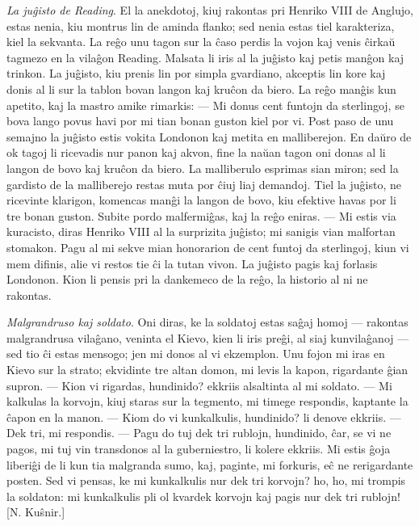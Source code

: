 \emph{La ju\^gisto de Reading}. El la anekdotoj, kiuj rakontas pri
Henriko VIII de Anglujo, estas nenia, kiu montrus lin de aminda
flanko; sed nenia estas tiel karakteriza, kiel la sekvanta. La
re\^go unu tagon sur la \^caso perdis la vojon kaj venis \^cirka\u u
tagmezo en la vila\^gon Reading. Malsata li iris al la ju\^gisto kaj
petis man\^gon kaj trinkon. La ju\^gisto, kiu prenis lin por simpla
gvardiano, akceptis lin kore kaj donis al li sur la tablon bovan
langon kaj kru\^con da biero. La re\^go man\^gis kun apetito, kaj la
mastro amike rimarkis: --- Mi donus cent funtojn da sterlingoj, se
bova lango povus havi por mi tian bonan guston kiel por vi. Post
paso de unu semajno la ju\^gisto estis vokita Londonon kaj metita en
malliberejon. En da\u uro de ok tagoj li ricevadis nur panon kaj
akvon, fine la na\u uan tagon oni donas al li langon de bovo kaj
kru\^con da biero. La malliberulo esprimas sian miron; sed la
gardisto de la malliberejo restas muta por \^ciuj liaj demandoj.
Tiel la ju\^gisto, ne ricevinte klarigon, komencas man\^gi la langon
de bovo, kiu efektive havas por li tre bonan guston. Subite pordo
malfermi\^gas, kaj la re\^go eniras. --- Mi estis via kuracisto,
diras Henriko VIII al la surprizita ju\^gisto; mi sanigis vian
malfortan stomakon. Pagu al mi sekve mian honorarion de cent funtoj
da sterlingoj, kiun vi mem difinis, alie vi restos tie \^ci la tutan
vivon. La ju\^gisto pagis kaj forlasis Londonon. Kion li pensis pri
la dankemeco de la re\^go, la historio al ni ne rakontas.

\emph{Malgrandruso kaj soldato}. Oni diras, ke la soldatoj estas
sa\^gaj homoj --- rakontas malgrandrusa vila\^gano, veninta el
Kievo, kien li iris pre\^gi, al siaj kunvila\^ganoj --- sed tio \^ci
estas mensogo; jen mi donos al vi ekzemplon. Unu fojon mi iras en
Kievo sur la strato; ekvidinte tre altan domon, mi levis la kapon,
rigardante \^gian supron. --- Kion vi rigardas, hundinido? ekkriis
alsaltinta al mi soldato. --- Mi kalkulas la korvojn, kiuj staras
sur la tegmento, mi timege respondis, kaptante la \^capon en la
manon. --- Kiom do vi kunkalkulis, hundinido? li denove ekkriis. ---
Dek tri, mi respondis. --- Pagu do tuj dek tri rublojn, hundinido,
\^car, se vi ne pagos, mi tuj vin transdonos al la guberniestro, li
kolere ekkriis. Mi estis \^goja liberi\^gi de li kun tia malgranda
sumo, kaj, paginte, mi forkuris, e\^c ne rerigardante posten. Sed vi
pensas, ke mi kunkalkulis nur dek tri korvojn? ho, ho, mi trompis la
soldaton: mi kunkalkulis pli ol kvardek korvojn kaj pagis nur dek
tri rublojn! [N. Ku\^snir.]

